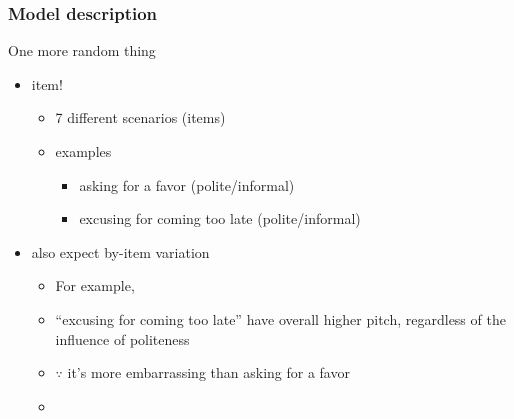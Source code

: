 \documentclass[10p]{beamer}\usepackage[]{graphicx}\usepackage[]{color}
\begin{document}
\begin{frame}
\frametitle{Model description}
One more random thing
\begin{itemize}
\item item!
	\begin{itemize}
	\item 7 different scenarios (items)
	\item examples
		\begin{itemize}
		\item asking for a favor (polite/informal)
		\item excusing for coming too late (polite/informal)
		\end{itemize}
	\end{itemize}
\item also expect by-item variation
	\begin{itemize}
	\item For example,
	\item ``excusing for coming too late'' have overall higher pitch, regardless of the influence of politeness
	\item $\because$ it's more embarrassing than asking for a favor
	\item 
	\end{itemize}
\end{itemize}
\end{frame}
\end{document}

